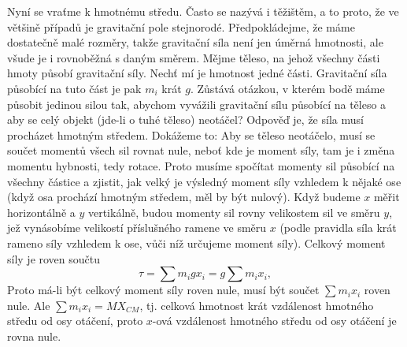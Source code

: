     Nyní se vraťme k hmotnému středu. Často se nazývá i těžištěm, a to proto, že ve většině případů
    je gravitační pole stejnorodé. Předpokládejme, že máme dostatečně malé rozměry, takže gravitační
    síla není jen úměrná hmotnosti, ale všude je i rovnoběžná s daným směrem. Mějme těleso, na jehož
    všechny části hmoty působí gravitační síly. Nechť mí je hmotnost jedné části. Gravitační síla
    působící na tuto část je pak \(m_i\) krát \(g\). Zůstává otázkou, v kterém bodě máme působit
    jedinou silou tak, abychom vyvážili gravitační sílu působící na těleso a aby se celý objekt
    (jde-li o tuhé těleso) neotáčel? Odpověď je, že síla musí procházet hmotným středem. Dokážeme
    to: Aby se těleso neotáčelo, musí se součet momentů všech sil rovnat nule, neboť kde je moment
    síly, tam je i změna momentu hybnosti, tedy rotace. Proto musíme spočítat momenty sil působící
    na všechny částice a zjistit, jak velký je výsledný moment síly vzhledem k nějaké ose (když osa
    prochází hmotným středem, měl by být nulový). Když budeme \(x\) měřit horizontálně a \(y\)
    vertikálně, budou momenty sil rovny velikostem sil ve směru \(y\), jež vynásobíme velikostí
    příslušného ramene ve směru \(x\) (podle pravidla síla krát rameno síly vzhledem k ose, vůči níž
    určujeme moment síly). Celkový moment síly je roven součtu
    \begin{equation}\label{fyz:eq742}
      τ=∑m_igx_i=g∑m_ix_i,
    \end{equation}
    Proto má-li být celkový moment síly roven nule, musí být součet \(∑m_ix_i\) roven nule. Ale
    \(∑m_ix_i=MX_{CM}\), tj. celková hmotnost krát vzdálenost hmotného středu od osy otáčení, proto
    \(x\)-ová vzdálenost hmotného středu od osy otáčení je rovna nule.

